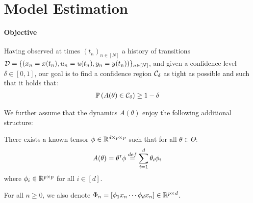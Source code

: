 \documentclass{article}
\begin{document}
\section{Model Estimation}

\paragraph{Objective}
Having observed at times $(t_n)_{n\in[N]}$ a history of transitions $\mathcal{D} = \{(x_n = x(t_n), u_n = u(t_n), y_n = y(t_n))\}_{n\in[N]}$, and given a confidence level $\delta\in[0, 1]$, our goal is to find a confidence region $\mathcal{C}_\delta$ as tight as possible and such that it holds that:
\begin{align}
\mathbb{P}\left(A(\theta)\in \mathcal{C}_\delta\right) \geq 1-\delta
\label{eq:polytope}
\end{align}



We further assume that the dynamics $A(\theta)$ enjoy the following additional structure:
\begin{assumption}
\label{assumpt:linear_param}
There exists a known tensor $\phi\in \mathbb{R}^{d \times p \times p}$ such that for all $\theta\in\Theta$:
\begin{equation}
    A(\theta) = \theta^{\mathsf{\scriptscriptstyle T}} \phi \stackrel{def}{=} \sum_{i=1}^d \theta_i\phi_i
\end{equation}
where $\phi_i\in\mathbb{R}^{p\times p}$ for all $i\in[d]$.

For all $n\geq 0$, we also denote $\Phi_n = [\phi_1 x_n \cdots \phi_d x_n]\in\mathbb{R}^{p\times d}$.
\end{assumption}
\end{document}
